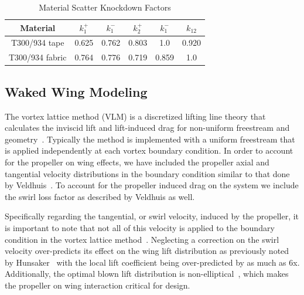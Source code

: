 \documentclass[conf]{new-aiaa}
\begin{document}
\setlength{\tabcolsep}{5pt}
\begin{table}[htbp]
    \begin{center}
        \caption{Material Scatter Knockdown Factors}
        \label{tab:scatterfactor}
        \begin{tabular}{cccccc}
            \midrule
            Material & \textbf{$k_1^+$} & \textbf{$k_1^-$} & \textbf{$k_2^+$} & \textbf{$k_1^-$} & \textbf{$k_{12}$} \\
            \midrule
            T300/934 tape & 0.625 & 0.762 & 0.803 & 1.0 & 0.920 \\
            T300/934 fabric & 0.764 & 0.776 & 0.719 & 0.859 & 1.0 \\
        \end{tabular}
    \end{center}
    \vspace{-12pt}
\end{table}

\subsection{Waked Wing Modeling}

\label{sec:VLM}

The vortex lattice method (VLM) is a discretized lifting line theory that calculates the inviscid lift and lift-induced drag for non-uniform freestream and geometry~\cite{Lan:1974aa}. Typically the method is implemented with a uniform freestream that is applied independently at each vortex boundary condition. In order to account for the propeller on wing effects, we have included the propeller axial and tangential velocity distributions in the boundary condition similar to that done by Veldhuis~\cite{proponwing}. To account for the propeller induced drag on the system we include the swirl loss factor as described by Veldhuis as well.

Specifically regarding the tangential, or swirl velocity, induced by the propeller, it is important to note that not all of this velocity is applied to the boundary condition in the vortex lattice method~\cite{Alba:2017aa}. Neglecting a correction on the swirl velocity over-predicts its effect on the wing lift distribution as previously noted by Hunsaker~\cite{Hunsaker:2006aa} with the local lift coefficient being over-predicted by as much as 6x. Additionally, the optimal blown lift distribution is non-elliptical~\cite{Veldhuis2004}, which makes the propeller on wing interaction critical for design.
\end{document}
